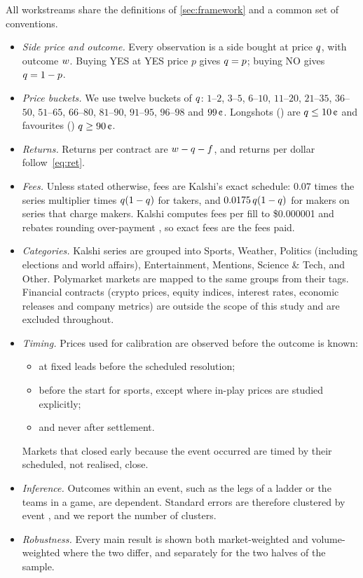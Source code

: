 All workstreams share the definitions of \cref{sec:framework} and a common set of conventions.
\begin{itemize}
  \item \emph{Side price and outcome.} Every observation is a side bought at price $q$, with
  outcome $w$. Buying YES at YES price $p$ gives $q=p$; buying NO gives $q=1-p$.
  \item \emph{Price buckets.} We use twelve buckets of $q$: $1$--$2$, $3$--$5$, $6$--$10$,
  $11$--$20$, $21$--$35$, $36$--$50$, $51$--$65$, $66$--$80$, $81$--$90$, $91$--$95$, $96$--$98$
  and $99\cents$. Longshots (\LS) are $\q\le10\cents$ and favourites (\FAV) $\q\ge90\cents$.
  \item \emph{Returns.} Returns per contract are $w-q-f$, and returns per dollar
  follow~\eqref{eq:ret}.
  \item \emph{Fees.} Unless stated otherwise, fees are Kalshi's exact schedule: $0.07$ times the
  series multiplier times $q(1-q)$ for takers, and $0.0175\,q(1-q)$ for makers on series that
  charge makers. Kalshi computes fees per fill to \$0.000001 and rebates rounding over-payment
  \citep{kalshirounding}, so exact fees are the fees paid.
  \item \emph{Categories.} Kalshi series are grouped into Sports, Weather, Politics (including
  elections and world affairs), Entertainment, Mentions, Science \& Tech, and Other. Polymarket
  markets are mapped to the same groups from their tags. Financial contracts (crypto prices,
  equity indices, interest rates, economic releases and company metrics) are outside the scope
  of this study and are excluded throughout.
  \item \emph{Timing.} Prices used for calibration are observed before the outcome is known:
  \begin{itemize}
    \item at fixed leads before the scheduled resolution;
    \item before the start for sports, except where in-play prices are studied explicitly;
    \item and never after settlement.
  \end{itemize}
  Markets that closed early because the event occurred are timed by their scheduled, not
  realised, close.
  \item \emph{Inference.} Outcomes within an event, such as the legs of a ladder or the teams in
  a game, are dependent. Standard errors are therefore clustered by event
  \citep{cameronmiller2015}, and we report the number of clusters.
  \item \emph{Robustness.} Every main result is shown both market-weighted and volume-weighted
  where the two differ, and separately for the two halves of the sample.
\end{itemize}
